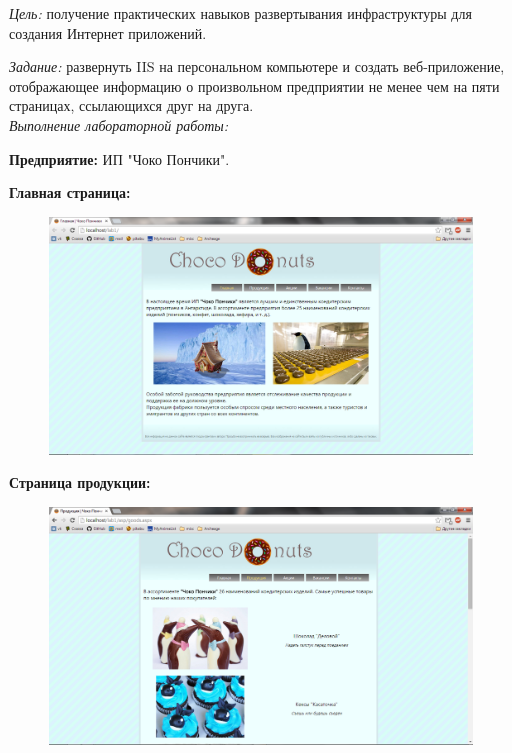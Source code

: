 \documentclass[pscyr,12pt]{hedlab}
\begin{document}
  \makeheader

  \emph{Цель:} получение практических навыков развертывания инфраструктуры для
  создания Интернет приложений.
  
  \emph{Задание:} развернуть IIS на персональном компьютере и создать
  веб-приложение, отображающее информацию о произвольном предприятии не менее
  чем на пяти страницах, ссылающихся друг на друга. \\

  \emph{Выполнение лабораторной работы:}
  
  \textbf{Предприятие:} ИП "Чоко Пончики".
  
  \textbf{Главная страница:}
  \begin{figure}[h!]
    \center
    \includegraphics[width=.95\textwidth]{main}
  \end{figure}
  
  \newpage
  
  \textbf{Страница продукции:}
  \begin{figure}[h!]
    \center
    \includegraphics[width=.95\textwidth]{goods}
  \end{figure}
  
\end{document}
